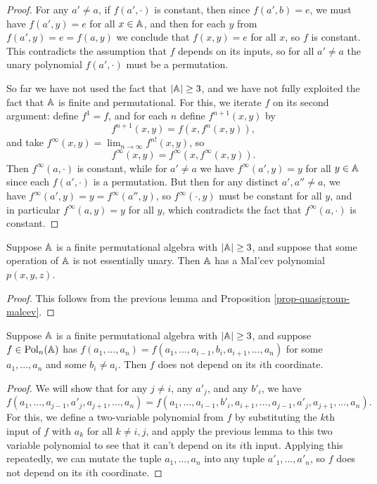 \begin{appendices}
\begin{proof}
For any $a' \ne a$, if $f(a',\cdot)$ is constant, then since $f(a',b) = e$, we must have $f(a',y) = e$ for all $x \in \mathbb{A}$, and then for each $y$ from $f(a',y) = e = f(a,y)$ we conclude that $f(x,y) = e$ for all $x$, so $f$ is constant. This contradicts the assumption that $f$ depends on its inputs, so for all $a' \ne a$ the unary polynomial $f(a', \cdot)$ must be a permutation.%

So far we have not used the fact that $|\mathbb{A}| \ge 3$, and we have not fully exploited the fact that $\mathbb{A}$ is finite and permutational. For this, we iterate $f$ on its second argument: define $f^1 = f$, and for each $n$ define $f^{n+1}(x,y)$ by
\[
f^{n+1}(x,y) = f(x,f^n(x,y)),
\]
and take $f^\infty(x,y) = \lim_{n \rightarrow \infty} f^{n!}(x,y)$, so
\[
f^\infty(x,y) = f^\infty(x,f^\infty(x,y)).
\]
Then $f^\infty(a,\cdot)$ is constant, while for $a' \ne a$ we have $f^\infty(a',y) = y$ for all $y \in \mathbb{A}$ since each $f(a',\cdot)$ is a permutation. But then for any distinct $a',a'' \ne a$, we have $f^\infty(a',y) = y = f^\infty(a'',y)$, so $f^\infty(\cdot,y)$ must be constant for all $y$, and in particular $f^\infty(a,y) = y$ for all $y$, which contradicts the fact that $f^\infty(a,\cdot)$ is constant.
\end{proof}

\begin{cor}\label{cor-permutational-malcev} Suppose $\mathbb{A}$ is a finite permutational algebra with $|\mathbb{A}| \ge 3$, and suppose that some operation of $\mathbb{A}$ is not essentially unary. Then $\mathbb{A}$ has a Mal'cev polynomial $p(x,y,z)$.
\end{cor}
\begin{proof} This follows from the previous lemma and Proposition \ref{prop-quasigroup-malcev}.
\end{proof}

\begin{cor}\label{cor-permutational-depend} Suppose $\mathbb{A}$ is a finite permutational algebra with $|\mathbb{A}| \ge 3$, and suppose $f \in \operatorname{Pol}_n(\mathbb{A})$ has $f(a_1, ..., a_n) = f(a_1, ..., a_{i-1}, b_i, a_{i+1}, ..., a_n)$ for some $a_1, ..., a_n$ and some $b_i \ne a_i$. Then $f$ does not depend on its $i$th coordinate.
\end{cor}
\begin{proof} We will show that for any $j \ne i$, any $a'_j$, and any $b'_i$, we have
\[
f(a_1, ..., a_{j-1}, a'_j, a_{j+1}, ..., a_n) = f(a_1, ..., a_{i-1}, b'_i, a_{i+1}, ..., a_{j-1}, a'_j, a_{j+1}, ..., a_n).
\]
For this, we define a two-variable polynomial from $f$ by substituting the $k$th input of $f$ with $a_k$ for all $k \ne i,j$, and apply the previous lemma to this two variable polynomial to see that it can't depend on its $i$th input. Applying this repeatedly, we can mutate the tuple $a_1, ..., a_n$ into any tuple $a'_1, ..., a'_n$, so $f$ does not depend on its $i$th coordinate.
\end{proof}


\end{appendices}
